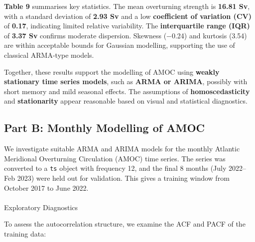 \documentclass[
  11pt,
]{article}
\makeatletter
\let\oldparagraph\paragraph
\renewcommand{\paragraph}{
    \@ifstar
      \xxxParagraphStar
      \xxxParagraphNoStar
  }
\newcommand{\xxxParagraphStar}[1]{\oldparagraph*{#1}\mbox{}}
\newcommand{\xxxParagraphNoStar}[1]{\oldparagraph{#1}\mbox{}}
\makeatother
\begin{document}
\textbf{Table 9} summarises key statistics. The mean overturning
strength is \textbf{16.81 Sv}, with a standard deviation of \textbf{2.93
Sv} and a low \textbf{coefficient of variation (CV)} of \textbf{0.17},
indicating limited relative variability. The \textbf{interquartile range
(IQR)} of \textbf{3.37 Sv} confirms moderate dispersion. Skewness
(−0.24) and kurtosis (3.54) are within acceptable bounds for Gaussian
modelling, supporting the use of classical ARMA-type models.

Together, these results support the modelling of AMOC using
\textbf{weakly stationary time series models}, such as \textbf{ARMA or
ARIMA}, possibly with short memory and mild seasonal effects. The
assumptions of \textbf{homoscedasticity} and \textbf{stationarity}
appear reasonable based on visual and statistical diagnostics.

\subsection{Part B: Monthly Modelling of
AMOC}\label{part-b-monthly-modelling-of-amoc}

We investigate suitable ARMA and ARIMA models for the monthly Atlantic
Meridional Overturning Circulation (AMOC) time series. The series was
converted to a \texttt{ts} object with frequency 12, and the final 8
months (July 2022--Feb 2023) were held out for validation. This gives a
training window from October 2017 to June 2022.

\paragraph{Exploratory Diagnostics}\label{exploratory-diagnostics}

To assess the autocorrelation structure, we examine the ACF and PACF of
the training data:
\end{document}
